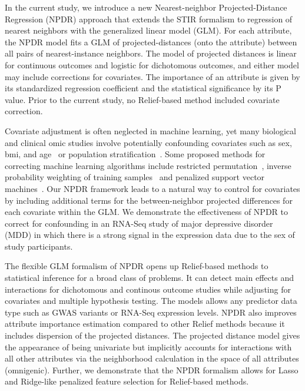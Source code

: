 \documentclass[10pt]{article}
\begin{document}
In the current study, we introduce a new Nearest-neighbor Projected-Distance Regression (NPDR) approach that extends the STIR formalism to regression of nearest neighbors with the generalized linear model (GLM).
For each attribute, the NPDR model fits a GLM of projected-distances (onto the attribute) between all pairs of nearest-instance neighbors.
The model of projected distances is linear for continuous outcomes and logistic for dichotomous outcomes, and either model may include corrections for covariates.
The importance of an attribute is given by its standardized regression coefficient and the statistical significance by its P value.
Prior to the current study, no Relief-based method included covariate correction.

Covariate adjustment is often neglected in machine learning, yet many biological and clinical omic studies involve potentially confounding covariates such as sex, bmi, and age~\cite{le18_brainagesim} or population stratification~\cite{popstrat16}.
Some proposed methods for correcting machine learning algorithms include restricted permutation~\cite{rao2017}, inverse probability weighting of training samples~\cite{linn2016} and penalized support vector machines~\cite{li2011ccsvm}.
Our NPDR framework leads to a natural way to control for covariates by including additional terms for the between-neighbor projected differences for each covariate within the GLM.
We demonstrate the effectiveness of NPDR to correct for confounding in an RNA-Seq study of major depressive disorder (MDD) in which there is a strong signal in the expression data due to the sex of study participants.

The flexible GLM formalism of NPDR opens up Relief-based methods to statistical inference for a broad class of problems.
It can detect main effects and interactions for dichotomous and continous outcome studies while adjusting for covariates and multiple hypothesis testing.
The models allows any predictor data type such as GWAS variants or RNA-Seq expression levels.
NPDR also improves attribute importance estimation compared to other Relief methods because it includes dispersion of the projected distances.
The projected distance model gives the appearance of being univariate but implicitly accounts for interactions with all other attributes via the neighborhood calculation in the space of all attributes (omnigenic).
Further, we demonstrate that the NPDR formalism allows for Lasso and Ridge-like penalized feature selection for Relief-based methods.
\end{document}

